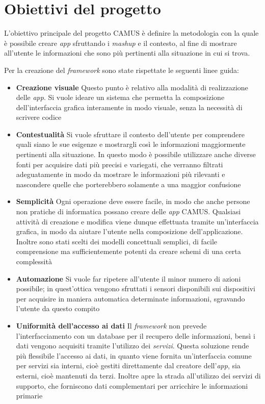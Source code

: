\section{Obiettivi del progetto\label{sec:obiettivi-progetto}}

L'obiettivo principale del progetto CAMUS è definire la metodologia con la quale è possibile creare \emph{app} sfruttando i \emph{mashup} e il contesto, al fine di mostrare all'utente le informazioni che sono più pertinenti alla situazione in cui si trova.

Per la creazione del \emph{framework} sono state rispettate le seguenti linee guida:

\begin{itemize}
	\item \textbf{Creazione visuale}
	Questo punto è relativo alla modalità di realizzazione delle \emph{app}. Si vuole ideare un sistema che permetta la composizione dell'interfaccia grafica interamente in modo visuale, senza la necessità di scrivere codice
	\item \textbf{Contestualità}
	Si vuole sfruttare il contesto dell'utente per comprendere quali siano le sue esigenze e mostrargli così le informazioni maggiormente pertinenti alla situazione. In questo modo è possibile utilizzare anche diverse fonti per acquisire dati più precisi e variegati, che verranno filtrati adeguatamente in modo da mostrare le informazioni più rilevanti e nascondere quelle che porterebbero solamente a una maggior confusione
	\item \textbf{Semplicità}
	Ogni operazione deve essere facile, in modo che anche persone non pratiche di informatica possano creare delle \emph{app} CAMUS. Qualsiasi attività di creazione e modifica viene dunque effettuata tramite un'interfaccia grafica, in modo da aiutare l'utente nella composizione dell'applicazione. Inoltre sono stati scelti dei modelli concettuali semplici, di facile comprensione ma sufficientemente potenti da creare schemi di una certa complessità
	\item \textbf{Automazione}
	Si vuole far ripetere all'utente il minor numero di azioni possibile; in quest'ottica vengono sfruttati i sensori disponibili sui dispositivi per acquisire in maniera automatica determinate informazioni, sgravando l'utente da questo compito
	\item \textbf{Uniformità dell'accesso ai dati}
	Il \emph{framework} non prevede l'interfacciamento con un database per il recupero delle informazioni, bensì i dati vengono acquisiti tramite l'utilizzo dei \emph{servizi}. Questa soluzione rende più flessibile l'accesso ai dati, in quanto viene fornita un'interfaccia comune per servizi sia interni, cioè gestiti direttamente dal creatore dell'\emph{app}, sia esterni, cioè mantenuti da terzi. Inoltre apre la strada all'utilizzo dei servizi di supporto, che forniscono dati complementari per arricchire le informazioni primarie

\end{itemize}
